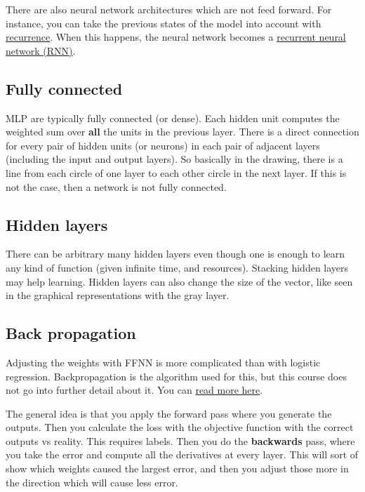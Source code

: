 \documentclass[
  11pt,
  british,
]{article}
\begin{document}
There are also neural network architectures which are not feed forward.
For instance, you can take the previous states of the model into account
with \href{Recurrence.md}{recurrence}. When this happens, the neural
network becomes a
\href{../Prediction/Recurrent\%20neural\%20network\%20(RNN).md}{recurrent
neural network (RNN)}.

\hypertarget{fully-connected}{%
\subsection{Fully connected}\label{fully-connected}}

MLP are typically fully connected (or dense). Each hidden unit computes
the weighted sum over \textbf{all} the units in the previous layer.
There is a direct connection for every pair of hidden units (or neurons)
in each pair of adjacent layers (including the input and output layers).
So basically in the drawing, there is a line from each circle of one
layer to each other circle in the next layer. If this is not the case,
then a network is not fully connected.

\hypertarget{hidden-layers}{%
\subsection{Hidden layers}\label{hidden-layers}}

There can be arbitrary many hidden layers even though one is enough to
learn any kind of function (given infinite time, and resources).
Stacking hidden layers may help learning. Hidden layers can also change
the size of the vector, like seen in the graphical representations with
the gray layer.

\hypertarget{back-propagation}{%
\subsection{Back propagation}\label{back-propagation}}

Adjusting the weights with FFNN is more complicated than with logistic
regression. Backpropagation is the algorithm used for this, but this
course does not go into further detail about it. You can
\href{http://neuralnetworksanddeeplearning.com/chap2.html}{read more
here}.

The general idea is that you apply the forward pass where you generate
the outputs. Then you calculate the loss with the objective function
with the correct outputs vs reality. This requires labels. Then you do
the \textbf{backwards} pass, where you take the error and compute all
the derivatives at every layer. This will sort of show which weights
caused the largest error, and then you adjust those more in the
direction which will cause less error.
\end{document}
